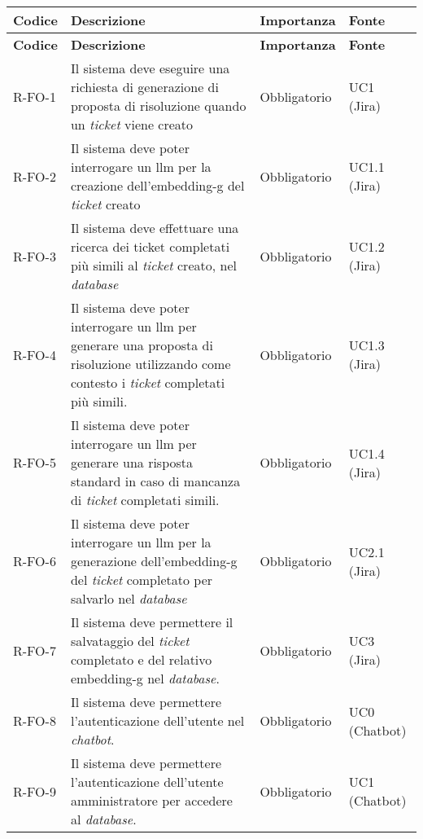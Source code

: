 \renewcommand{\arraystretch}{1.4}
\begin{longtable}{|p{1.5cm}|p{5.5cm}|p{2cm}|p{2.5cm}|} 
    \hline
    \rowcolor{tableheader}\textbf{Codice} & \textbf{Descrizione} & \textbf{Importanza} & \textbf{Fonte}\\
    \hline
    \endfirsthead

    \rowcolor{tableheader}\textbf{Codice} & \textbf{Descrizione} & \textbf{Importanza} & \textbf{Fonte} \\
    \hline
    \endhead

    \hline
    \endfoot

    \hline
    \endlastfoot
    \hline
    R-FO-1 & Il sistema deve eseguire una richiesta di generazione di proposta di risoluzione quando un \textit{ticket} viene creato & Obbligatorio & UC1 (Jira) \\
    \hline
    \rowcolor{tableevenrow} R-FO-2 & Il sistema deve poter interrogare un \gls{llm} per la creazione dell'\gls{embedding-g} del \textit{ticket} creato & Obbligatorio & UC1.1 (Jira) \\
    \hline
    R-FO-3 & Il sistema deve effettuare una ricerca dei ticket completati più simili al \textit{ticket} creato, nel \textit{database} & Obbligatorio & UC1.2 (Jira) \\
    \hline
    \rowcolor{tableevenrow} R-FO-4 & Il sistema deve poter interrogare un \gls{llm} per generare una proposta di risoluzione utilizzando come contesto i \textit{ticket} completati più simili. & Obbligatorio & UC1.3 (Jira) \\
    \hline
    R-FO-5 & Il sistema deve poter interrogare un \gls{llm} per generare una risposta standard in caso di mancanza di \textit{ticket} completati simili. & Obbligatorio & UC1.4 (Jira) \\
    \hline
    \rowcolor{tableevenrow} R-FO-6 & Il sistema deve poter interrogare un \gls{llm} per la generazione dell'\gls{embedding-g} del \textit{ticket} completato per salvarlo nel \textit{database} & Obbligatorio & UC2.1 (Jira) \\
    \hline
    R-FO-7 & Il sistema deve permettere il salvataggio del \textit{ticket} completato e del relativo \gls{embedding-g} nel \textit{database}. & Obbligatorio & UC3 (Jira) \\
    \hline
    \rowcolor{tableevenrow} R-FO-8 & Il sistema deve permettere l'autenticazione dell'utente nel \textit{chatbot}. & Obbligatorio & UC0 (Chatbot) \\
    \hline
    R-FO-9 & Il sistema deve permettere l'autenticazione dell'utente amministratore per accedere al \textit{database}. & Obbligatorio & UC1 (Chatbot) \\

\end{longtable}

